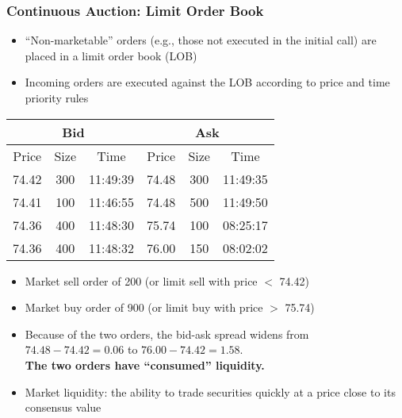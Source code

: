 \documentclass[10pt]{beamer}
\begin{document}
	\begin{frame}
		\frametitle{Continuous Auction: Limit Order Book}
		\begin{itemize}
			\item ``Non-marketable'' orders (e.g., those not executed in the initial call) are placed in a limit order book (LOB)
			\item Incoming orders are executed against the LOB according to price and time priority rules
		\end{itemize}	
		
		\begin{table}
			\centering
			\begin{tabular}{ccc|ccc}
				\hline
				\multicolumn{3}{c|}{Bid} & \multicolumn{3}{c}{Ask} \\ \hline
				Price  & Size & Time     & Price & Size & Time     \\ \hline
				74.42  & 300  & 11:49:39 & 74.48 & 300  & 11:49:35 \\
				74.41  & 100  & 11:46:55 & 74.48 & 500  & 11:49:50 \\
				74.36  & 400  & 11:48:30 & 75.74 & 100  & 08:25:17 \\
				74.36  & 400  & 11:48:32 & 76.00 & 150  & 08:02:02 \\ \hline
			\end{tabular}%
		\end{table}	
		
		\begin{itemize}
			\item Market sell order of 200 (or limit sell with price $<$ 74.42)
			\item Market buy order of 900 (or limit buy with price $>$ 75.74)
			\item Because of the two orders, the bid-ask spread widens from $74.48 - 74.42 = 0.06$ to $76.00 - 74.42 = 1.58$. \\
			\textbf{The two orders have “consumed” liquidity.}
			\item Market liquidity: the ability to trade securities quickly at a price close to its consensus value
			
		\end{itemize}
		
	\end{frame}
	
	
	
\end{document}
